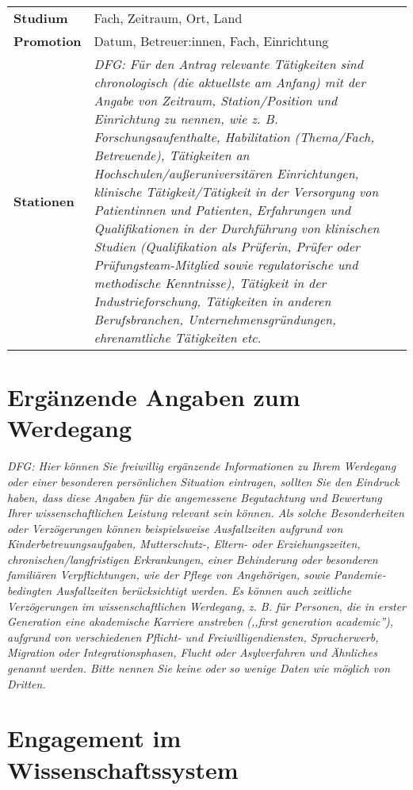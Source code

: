 \documentclass[a4paper,11pt]{article}
\begin{document}
\noindent
\begin{tabularx}{\textwidth}{@{}lX}
  \textbf{Studium} & Fach, Zeitraum, Ort, Land \\
  \textbf{Promotion} & Datum, Betreuer:innen, Fach, Einrichtung\\
  \textbf{Stationen} & \emph{DFG: Für den Antrag relevante Tätigkeiten sind chronologisch (die aktuellste am Anfang) mit der Angabe von Zeitraum, Station/Position und Einrichtung zu nennen, wie z. B. Forschungsaufenthalte, Habilitation (Thema/Fach, Betreuende), Tätigkeiten an Hochschulen/außeruniversitären Einrichtungen, klinische Tätigkeit/Tätigkeit in der Versorgung von Patientinnen und Patienten, Erfahrungen und Qualifikationen in der Durchführung von klinischen Studien (Qualifikation als Prüferin, Prüfer oder Prüfungsteam-Mitglied sowie regulatorische und methodische Kenntnisse), Tätigkeit in der Industrieforschung, Tätigkeiten in anderen Berufsbranchen, Unternehmensgründungen, ehrenamtliche Tätigkeiten etc.}
\end{tabularx}

\section*{Ergänzende Angaben zum Werdegang}

\emph{DFG: Hier können Sie freiwillig ergänzende Informationen zu
  Ihrem Werdegang oder einer besonderen persönlichen Situation
  eintragen, sollten Sie den Eindruck haben, dass diese Angaben für
  die angemessene Begutachtung und Bewertung Ihrer wissenschaftlichen
  Leistung relevant sein können. Als solche Besonderheiten oder
  Verzögerungen können beispielsweise Ausfallzeiten aufgrund von
  Kinderbetreuungsaufgaben, Mutterschutz-, Eltern- oder
  Erziehungszeiten, chronischen/langfristigen Erkrankungen, einer
  Behinderung oder besonderen familiären Verpflichtungen, wie der
  Pflege von Angehörigen, sowie Pandemie-bedingten Ausfallzeiten
  berücksichtigt werden. Es können auch zeitliche Verzögerungen im
  wissenschaftlichen Werdegang, z. B. für Personen, die in erster
  Generation eine akademische Karriere anstreben (,,first generation
  academic''), aufgrund von verschiedenen Pflicht- und
  Freiwilligendiensten, Spracherwerb, Migration oder
  Integrationsphasen, Flucht oder Asylverfahren und Ähnliches genannt
  werden. Bitte nennen Sie keine oder so wenige Daten wie möglich von
  Dritten. }

\section*{Engagement im Wissenschaftssystem}%
\end{document}
